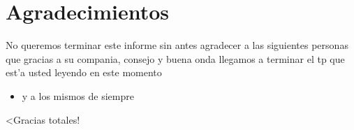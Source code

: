 \section{Agradecimientos}

	No queremos terminar este informe sin antes agradecer a las siguientes personas que gracias a su compania, consejo y buena onda llegamos a terminar el tp que est'a usted leyendo en este momento
\begin{itemize}
 \item y a los mismos de siempre
\end{itemize}

	<Gracias totales!
